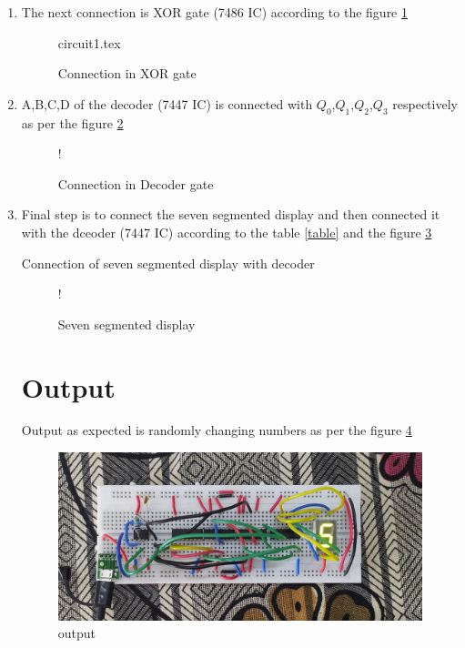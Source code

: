 \documentclass[12pt]{article}
\begin{document}
\begin{enumerate}[]
	\item The next connection is XOR gate (7486 IC) according to the figure \ref{XOR} 
	
	\begin{figure}
		\centering
		
		{circuit1.tex}
		\caption{Connection in XOR gate}
		\label{XOR}
	\end{figure}



\item  A,B,C,D of the decoder (7447 IC) is connected with $Q_0$,$Q_1$,$Q_2$,$Q_3$ respectively as per the figure \ref{7447}

\begin{figure}[!h]
\begin{center}
\resizebox {\columnwidth} {!} {}
\end{center}
\caption{Connection in Decoder gate}
\label{7447}
\end{figure}


\item Final step is to connect the seven segmented display and then connected it with the dceoder (7447 IC) according to the table \ref{table} and the figure \ref{SSD}


\begin{table}[!h]
	\centering
	
	\caption{Connection of seven segmented display with decoder}
	\label{table}
\end{table}

\begin{figure}[!h]
	\begin{center}
		 {!} {
			
		}
	\end{center}
	\caption{Seven segmented display}
	\label{SSD}
\end{figure}


\section*{Output} 
Output as expected is randomly changing numbers as per the figure \ref{output}
\begin{figure}[h]
	\includegraphics[width=\linewidth]{figs/output.jpg}
	\caption{output}
	\label{output}
\end{figure}













\end{enumerate}
\end{document}
